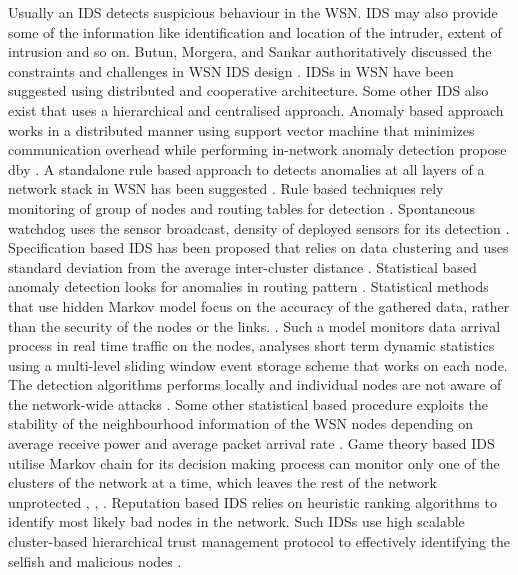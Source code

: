\documentclass[conference,man]{IEEEtran}
\begin{document}
Usually an IDS detects suspicious behaviour in the WSN.
IDS may also provide some of the information like identification and location of the intruder, extent of intrusion and so on.
Butun, Morgera, and Sankar authoritatively discussed the constraints and challenges in WSN IDS design \cite{6517052}.
IDSs in WSN have been suggested using distributed and cooperative architecture. 
Some other IDS also exist that  uses a  hierarchical and centralised approach.
Anomaly based approach works in a distributed manner using support vector machine that minimizes communication overhead while performing in-network anomaly detection propose dby \cite{ISI:000257882502160}.
A standalone rule based approach to detects anomalies at all layers of a network stack in WSN has been suggested \cite{ISI:000232429900067}.
Rule based  techniques rely  monitoring of group of nodes and routing tables for detection \cite{ISI:000298891500099, Chen:2009:NMI:1516241.1516282, 1424814, Strikos_afull}.
Spontaneous watchdog uses the sensor broadcast, density of deployed sensors for its detection \cite{1593102}.
Specification based  IDS has been proposed that relies on data clustering and uses standard deviation from the average inter-cluster distance \cite{Chen:2009:NMI:1516241.1516282, 1424814, Strikos_afull, 4085803}. 
Statistical based anomaly  detection looks for anomalies in routing pattern \cite{4024996}.
Statistical methods that use hidden Markov model focus on the accuracy of the gathered data, rather than the security of the nodes or the links.  \cite{1290173}.
Such a model monitors data arrival process in real time traffic on the nodes, analyses short term dynamic statistics using a multi-level sliding window event storage scheme that works on each node. The detection algorithms performs locally and individual nodes are not aware of the network-wide attacks \cite{1515559}.
Some other statistical based procedure exploits the stability of the neighbourhood information of the WSN nodes depending on average receive power and average packet arrival rate \cite{1512911}.
Game theory based IDS utilise Markov chain for its decision making process can monitor only one of the clusters of the network at a time, which leaves the rest of the network unprotected \cite{1347798}, \cite{Das07preventingdos}, \cite{Reddy:2009:GTA:1607720.1607944}.
Reputation based IDS relies on heuristic ranking algorithms to identify most likely bad nodes in the network.
Such IDSs use high scalable cluster-based hierarchical trust management protocol to effectively identifying the selfish and malicious nodes \cite{6174485}.
\end{document}
